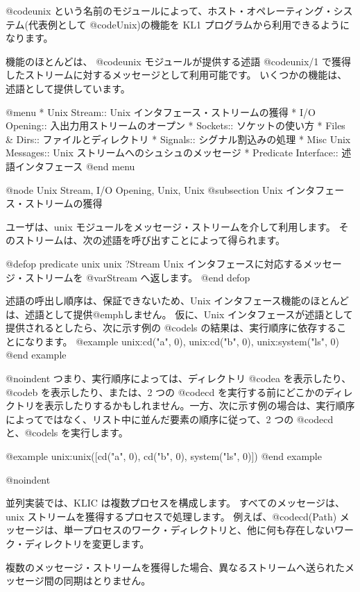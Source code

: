 {{{{@code{unix} という名前のモジュールによって、ホスト・オペレーティング・システム(代表例として @code{Unix})の機能を KL1 プログラムから利用できるようになります。

機能のほとんどは、 @code{unix} モジュールが提供する述語 @code{unix/1} で獲得したストリームに対するメッセージとして利用可能です。
いくつかの機能は、述語として提供しています。

@menu
* Unix Stream::                 Unix インタフェース・ストリームの獲得
* I/O Opening::                 入出力用ストリームのオープン
* Sockets::                     ソケットの使い方
* Files & Dirs::                ファイルとディレクトリ
* Signals::                     シグナル割込みの処理
* Misc Unix Messages::          Unix ストリームへのシュシュのメッセージ
* Predicate Interface::         述語インタフェース
@end menu

@node Unix Stream, I/O Opening, Unix, Unix
@subsection Unix インタフェース・ストリームの獲得

ユーザは、unix モジュールをメッセージ・ストリームを介して利用します。
そのストリームは、次の述語を呼び出すことによって得られます。

@defop {predicate} {unix} unix ?Stream
Unix インタフェースに対応するメッセージ・ストリームを @var{Stream} へ返します。
@end defop

述語の呼出し順序は、保証できないため、Unix インタフェース機能のほとんどは、述語として提供@emph{しません}。
仮に、Unix インタフェースが述語として提供されるとしたら、次に示す例の @code{ls} の結果は、実行順序に依存することになります。
@example
unix:cd("a", 0),
unix:cd("b", 0),
unix:system("ls", 0)
@end example

@noindent
つまり、実行順序によっては、ディレクトリ @code{a} を表示したり、 @code{b} を表示したり、または、2 つの @code{cd} を実行する前にどこかのディレクトリを表示したりするかもしれません。一方、次に示す例の場合は、実行順序によってではなく、リスト中に並んだ要素の順序に従って、2 つの @code{cd} と、@code{ls} を実行します。

@example
unix:unix([cd("a", 0),
           cd("b", 0),
           system("ls", 0)])
@end example

@noindent

並列実装では、KLIC は複数プロセスを構成します。
すべてのメッセージは、unix ストリームを獲得するプロセスで処理します。
例えば、@code{cd(Path)} メッセージは、単一プロセスのワーク・ディレクトリと、他に何も存在しないワーク・ディレクトリを変更します。

複数のメッセージ・ストリームを獲得した場合、異なるストリームへ送られたメッセージ間の同期はとりません。

}}}}
